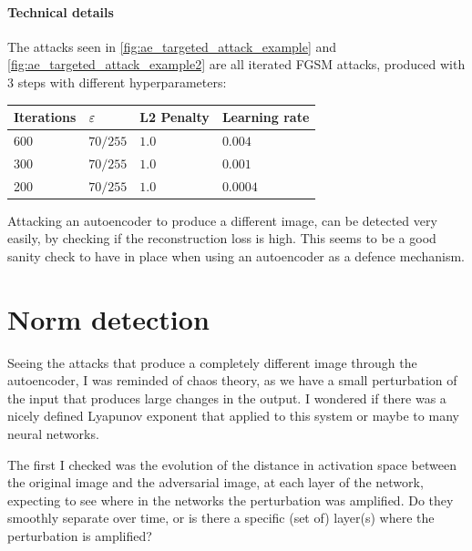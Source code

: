 \documentclass[]{scrarticle}
\begin{document}
\paragraph{Technical details}
The attacks seen in \autoref{fig:ae_targeted_attack_example} and
\ref{fig:ae_targeted_attack_example2}
 are all iterated FGSM attacks,
produced with 3 steps with different hyperparameters:
\begin{center}
  \begin{tabular}{llll}
    Iterations & $\varepsilon$ & L2 Penalty & Learning rate \\
    \hline
    600 & $70 / 255$ & $1.0$ & $0.004$ \\
    300 & $70 / 255$ & $1.0$ & $0.001$ \\
    200 & $70 / 255$ & $1.0$ & $0.0004$ \\
  \end{tabular}
\end{center}


\begin{remark}
  Attacking an autoencoder to produce a different image, can be detected
  very easily, by checking if the reconstruction loss is high.
  This seems to be a good sanity check to have in place when using
  an autoencoder as a defence mechanism.
\end{remark}

\clearpage
\section{Norm detection}

Seeing the attacks that produce a completely different image
through the autoencoder, I was reminded of chaos theory,
as we have a small perturbation of the input that produces
large changes in the output.
I wondered if there was a nicely defined Lyapunov exponent
that applied to this system or maybe to many neural networks.

The first I checked was the evolution of the distance in
activation space between the original image and the adversarial image,
at each layer of the network, expecting to see where in
the networks the perturbation was amplified. Do they smoothly
separate over time, or is there a specific (set of) layer(s)
where the perturbation is amplified?
\end{document}

